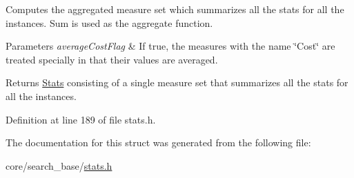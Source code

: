 Computes the aggregated measure set which summarizes all the stats for all the instances. Sum is used as the aggregate function. 


\begin{DoxyParams}{Parameters}
{\em average\+Cost\+Flag} & If {\ttfamily true}, the measures with the name \char`\"{}\+Cost\char`\"{} are treated specially in that their values are averaged. \\
\hline
\end{DoxyParams}
\begin{DoxyReturn}{Returns}
\hyperlink{structslb_1_1core_1_1sb_1_1Stats}{Stats} consisting of a single measure set that summarizes all the stats for all the instances. 
\end{DoxyReturn}


Definition at line 189 of file stats.\+h.



The documentation for this struct was generated from the following file\+:\begin{DoxyCompactItemize}
\item 
core/search\+\_\+base/\hyperlink{stats_8h}{stats.\+h}\end{DoxyCompactItemize}

